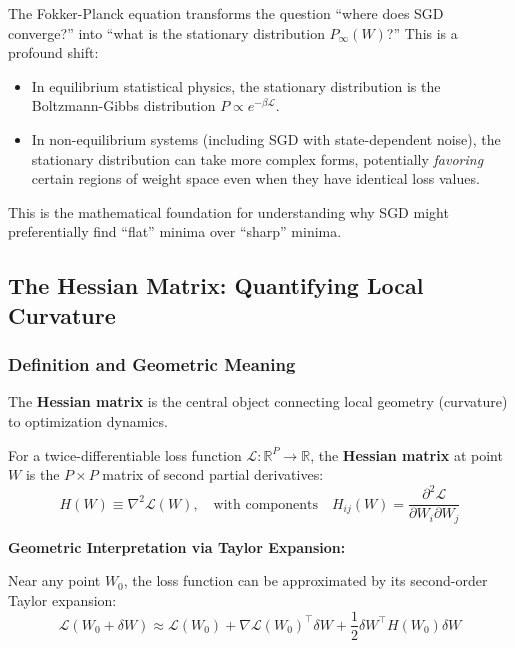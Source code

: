 \documentclass[
  journal=largetwo,
  year=2025,
  volume=37,
]{cup-journal}
\begin{document}
\begin{remark}
The Fokker-Planck equation transforms the question ``where does SGD converge?'' into ``what is the stationary distribution $P_{\infty}(W)$?'' This is a profound shift:
\begin{itemize}
    \item In equilibrium statistical physics, the stationary distribution is the Boltzmann-Gibbs distribution $P \propto e^{-\beta \mathcal{L}}$.
    \item In non-equilibrium systems (including SGD with state-dependent noise), the stationary distribution can take more complex forms, potentially \textit{favoring} certain regions of weight space even when they have identical loss values.
\end{itemize}
This is the mathematical foundation for understanding why SGD might preferentially find ``flat'' minima over ``sharp'' minima.
\end{remark}

\subsection{The Hessian Matrix: Quantifying Local Curvature}

\subsubsection{Definition and Geometric Meaning}

The \textbf{Hessian matrix} is the central object connecting local geometry (curvature) to optimization dynamics.

\begin{definition}\label{def:hessian}
For a twice-differentiable loss function $\mathcal{L}: \mathbb{R}^P \to \mathbb{R}$, the \textbf{Hessian matrix} at point $W$ is the $P \times P$ matrix of second partial derivatives:
\begin{equation}\label{eq:hessian_def}
    H(W) \equiv \nabla^2 \mathcal{L}(W), \quad \text{with components} \quad H_{ij}(W) = \frac{\partial^2 \mathcal{L}}{\partial W_i \partial W_j}
\end{equation}
\end{definition}

\textbf{Geometric Interpretation via Taylor Expansion:}

Near any point $W_0$, the loss function can be approximated by its second-order Taylor expansion:
\begin{equation}\label{eq:taylor_loss}
    \mathcal{L}(W_0 + \delta W) \approx \mathcal{L}(W_0) + \nabla \mathcal{L}(W_0)^\top \delta W + \frac{1}{2} \delta W^\top H(W_0) \delta W
\end{equation}
\end{document}
